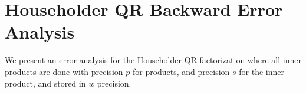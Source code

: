 \documentclass{article}
\newcommand{\tth}{\theta}
\theoremstyle{definition}
\begin{document}
%
%

\section{Householder QR Backward Error Analysis}
We present an error analysis for the Householder QR factorization where all inner products are done with precision $p$ for products, and precision $s$ for the inner product, and stored in $w$ precision.
\end{document}
